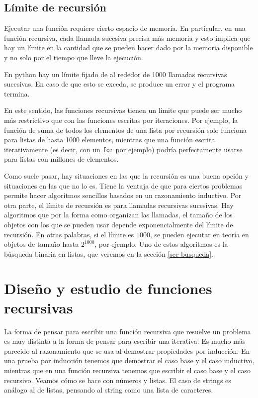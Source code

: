 \documentclass[a4paper, 12pt]{report}
\theoremstyle{definition}
\begin{document}
\subsection{Límite de recursión}

Ejecutar una función requiere cierto espacio de memoria. En particular, en una función recursiva, cada llamada sucesiva precisa más memoria y esto implica que hay un límite en la cantidad que se pueden hacer dado por la memoria disponible y no solo por el tiempo que lleve la ejecución.

En python hay un límite fijado de al rededor de 1000 llamadas recursivas sucesivas. En caso de que esto se exceda, se produce un error y el programa termina.

En este sentido, las funciones recursivas tienen un límite que puede ser mucho más restrictivo que con las funciones escritas por iteraciones. Por ejemplo, la función de suma de todos los elementos de una lista por recursión solo funciona para listas de hasta 1000 elementos, mientras que una función escrita iterativamente (es decir, con un {\tt for} por ejemplo) podría perfectamente usarse para listas con millones de elementos.

Como suele pasar, hay situaciones en las que la recursión es una buena opción y situaciones en las que no lo es. Tiene la ventaja de que para ciertos problemas permite hacer algoritmos sencillos basados en un razonamiento inductivo. Por otra parte, el límite de recursión es para llamadas recursivas sucesivas. Hay algoritmos que por la forma como organizan las llamadas, el tamaño de los objetos con los que se pueden usar depende exponencialmente del límite de recursión. En otras palabras, si el límite es $1000$, se pueden ejecutar en teoría en objetos de tamaño hasta $2^{1000}$, por ejemplo. Uno de estos algoritmos es la búsqueda binaria en listas, que veremos en la sección \ref{sec-busqueda}.

\section{Diseño y estudio de funciones recursivas}

La forma de pensar para escribir una función recursiva que resuelve un problema es muy distinta a la forma de pensar para escribir una iterativa. Es mucho más parecido al razonamiento que se usa al demostrar propiedades por inducción. En una prueba por inducción tenemos que demostrar el caso base y el caso inductivo, mientras que en una función recursiva tenemos que escribir el caso base y el caso recursivo. Veamos cómo se hace con números y listas. El caso de strings es análogo al de listas, pensando al string como una lista de caracteres.
\end{document}
